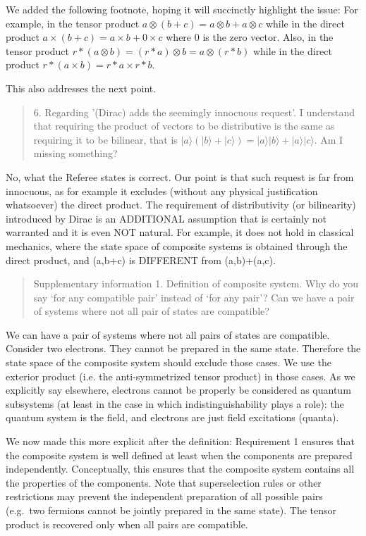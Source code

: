 \documentclass[11pt]{article}
\def\>{\rangle}
\begin{document}
We added the following footnote, hoping it will succinctly highlight
the issue: For example, in the tensor product $a \otimes (b+c) = a
\otimes b + a \otimes c$ while in the direct product $a \times (b+c) =
a \times b + 0 \times c$ where $0$ is the zero vector. Also, in the
tensor product $r * (a \otimes b) = (r*a) \otimes b = a \otimes (r*b)$
while in the direct product $r * (a \times b) = r*a \times r*b$.

This also addresses the next point.

\begin{quote}
6. Regarding '(Dirac) adds the seemingly innocuous
request'. I understand that requiring the product of vectors to be
distributive is the same as requiring it to be bilinear, that is $|a\>
(|b\> + |c\>) = |a\>|b\> + |a\>|c\>$. Am I missing something?
\end{quote}

No, what the Referee states is correct. Our point is that such request
is far from innocuous, as for example it excludes (without any
physical justification whatsoever) the direct product. The requirement
of distributivity (or bilinearity) introduced by Dirac is an
ADDITIONAL assumption that is certainly not warranted and it is even
NOT natural. For example, it does not hold in classical mechanics,
where the state space of composite systems is obtained through the
direct product, and (a,b+c) is DIFFERENT from (a,b)+(a,c).

\begin{quote}
Supplementary information 1. Definition of composite
system. Why do you say `for any compatible pair' instead of `for any
pair'? Can we have a pair of systems where not all pair of states are
compatible?
\end{quote}

We can have a pair of systems where not all pairs of states are
compatible. Consider two electrons. They cannot be prepared in the
same state. Therefore the state space of the composite system should
exclude those cases. We use the exterior product (i.e. the
anti-symmetrized tensor product) in those cases. As we explicitly say
elsewhere, electrons cannot be properly be considered as quantum
subsystems (at least in the case in which indistinguishability plays a
role): the quantum system is the field, and electrons are just field
excitations (quanta).

We now made this more explicit after the definition: Requirement 1
ensures that the composite system is well defined at least when the
components are prepared independently. Conceptually, this ensures that
the composite system contains all the properties of the
components. Note that superselection rules or other restrictions may
prevent the independent preparation of all possible pairs (e.g.~two
fermions cannot be jointly prepared in the same state). The tensor
product is recovered only when all pairs are compatible.
\end{document}
